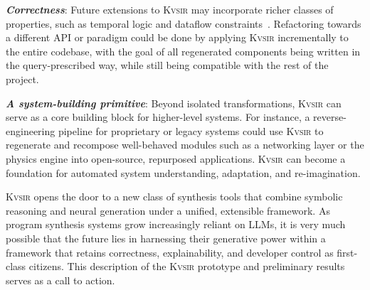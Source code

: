 \documentclass[sigplan,review,anonymous,10pt]{acmart}
\newcommand{\sys}{{\scshape Kv{\textalpha}sir}\xspace}
\newcommand{\heading}[1]{\vspace{2pt}\noindent\textbf{\emph{#1}}:\enspace}
\begin{document}
\heading{Correctness}
Future extensions to \sys may incorporate richer classes of properties, such as
temporal logic and dataflow
constraints~\cite{azzopardi2023ltl,handa2021orderawaredataflowmodelparallel}.
Refactoring towards a different API or paradigm could be done by applying 
\sys incrementally to the entire codebase, with the goal of all regenerated 
components being written in the query-prescribed way, while still being compatible 
with the rest of the project.

\heading{A system-building primitive}
Beyond isolated transformations, \sys can serve as a core building block for
higher-level systems.
For instance, a reverse-engineering pipeline for
proprietary or legacy systems could use \sys to regenerate and recompose
well-behaved modules such as a networking layer or the physics engine into open-source,
repurposed applications.
\sys can become a foundation for automated system understanding, adaptation, and re-imagination.






\sys opens the door to a new class of synthesis tools that combine symbolic
reasoning and neural generation under a unified, extensible framework.
As program synthesis systems grow increasingly reliant on LLMs, it is very much possible that the
future lies in harnessing their generative power within a framework that retains
correctness, explainability, and developer control as first-class citizens.
This description of the \sys prototype and preliminary results serves 
as a call to action.
\end{document}
